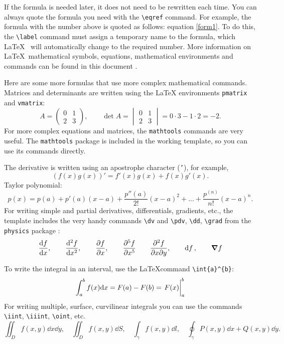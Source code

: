 \documentclass[]{VUMIFTemplateClass}
\begin{document}
\bigskip

If the formula is needed later, it does not need to be rewritten each time. You can always quote the formula you need with the \texttt{\textbackslash eqref} command. For example, the formula with the number above is quoted as follows: equation \eqref{form1}. To do this, the \texttt{\textbackslash label} command must assign a temporary name to the formula, which \LaTeX~ will automatically change to the required number. More information on \LaTeX~mathematical symbols, equations, mathematical environments and commands can be found in this document \cite{amsdoc}.

\bigskip

Here are some more formulas that use more complex mathematical commands. Matrices and determinants are written using the LaTeX environments \texttt{pmatrix} and \texttt{vmatrix}:
\[
A= \begin{pmatrix}
    0 & 1\\
    2 & 3
\end{pmatrix}, \qquad
\det A =
\begin{vmatrix}
0 & 1\\
2 & 3    
\end{vmatrix} = 0 \cdot 3 - 1 \cdot 2 = -2.
\]
For more complex equations and matrices, the \texttt{mathtools} \cite{mtoolsdoc} commands are very useful. The \texttt{mathtools} package is included in the working template, so you can use its commands directly.

The derivative is written using an apostrophe character (\texttt{'}), for example,
\[
(f(x)g(x))' = f'(x)g(x) + f(x)g'(x).
\]
Taylor polynomial:
\[
p(x) = p(a) + p'(a)(x-a)+\frac{p''(a)}{2!}(x-a)^2 + ... + \frac{p^{(n)}}{n!}(x-a)^n.
\]
For writing simple and partial derivatives, differentials, gradients, etc., the template includes the very handy commands \texttt{\textbackslash dv} and \texttt{\textbackslash pdv}, \texttt{\textbackslash dd}, \texttt{\textbackslash grad} from the \texttt{physics} package \cite{physdoc}:
\[
\dv{f}{x},  \qquad
\dv[2]{f}{x}, \qquad
\pdv{f}{x},  \qquad
\pdv[5]{f}{x} \qquad
\pdv{f}{x}{y}, \qquad
\dd{f}, \qquad
\grad{f}
\]

To write the integral in an interval, use the \LaTeX command \texttt{\textbackslash int\textunderscore \{a\}\^{}\{b\}}:
\[
\int_{a}^{b}f(x) \dd x = F(a) - F(b) = \eval{F(x)}_{a}^{b}
\]
For writing multiple, surface, curvilinear integrals you can use the commands \texttt{\textbackslash iint}, \texttt{\textbackslash iiint}, \texttt{\textbackslash oint}, etc.
\[
\iint_{D}f(x, y)\dd{x}\dd{y},\quad
\iint_{D} f(x,y)\dd{S}, \quad
\int_{\gamma} f(x,y)\dd{l},\quad
\oint_{\gamma} P(x,y)\dd{x}+Q(x,y)\dd{y}.
\]
\end{document}
